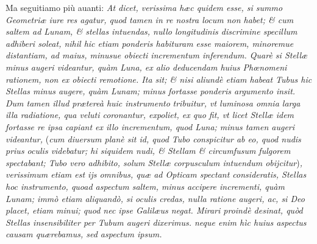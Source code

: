 \documentclass[11pt,twoside,openany]{book}
\begin{document}
\par\bigskip\noindent{}\enspace Ma seguitiamo più auanti: \textit{At dicet, verissima hæc quidem esse, si summo Geometriæ iure res agatur, quod tamen in re nostra locum non habet; \& cum saltem ad Lunam, \& stellas intuendas, nullo longitudinis discrimine specillum adhiberi soleat, nihil hic etiam ponderis habituram esse maiorem, minoremue distantiam, ad maius, minusue obiecti incrementum inferendum. Quarè si Stellæ minus augeri videantur, quàm Luna, ex alio deducendam huius Phœnomeni rationem, non ex obiecti remotione. Ita sit; \& nisi aliundè etiam habeat Tubus hic Stellas minus augere, quàm Lunam; minus fortasse ponderis argumento insit. Dum tamen illud prætereà huic instrumento }\textit{tribuitur, vt luminosa omnia larga illa radiatione, qua veluti coronantur, expoliet, ex quo fit, vt licet Stellæ idem fortasse re ipsa capiant ex illo incrementum, quod Luna; minus tamen augeri videantur, }(\textit{cum diuersum planè sit id, quod Tubo conspicitur ab eo, quod nudis prius oculis videbatur; hi siquidem nudi, \& Stellam \& circumfusum fulgorem spectabant; Tubo vero adhibito, solum Stellæ corpusculum intuendum obijcitur})\textit{, verissimum etiam est ijs omnibus, quæ ad Opticam spectant consideratis, Stellas hoc instrumento, quoad aspectum saltem, minus accipere incrementi, quàm Lunam; immò etiam aliquandò, si oculis credas, nulla ratione augeri, ac, si Deo placet, etiam minui; quod nec ipse Galilæus negat. Mirari proindè desinat, quòd Stellas insensibiliter per Tubum augeri dixerimus. neque enim hìc huius aspectus causam quærebamus, sed aspectum ipsum.}
\end{document}
